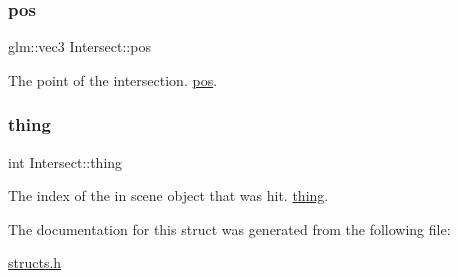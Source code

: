 \subsubsection{\texorpdfstring{pos}{pos}}
{\footnotesize\ttfamily glm\+::vec3 Intersect\+::pos}

The point of the intersection. \mbox{\hyperlink{struct_intersect_acac3d72036e36079b68fdfecf071785c}{pos}}. \mbox{\label{struct_intersect_a0db00f51f704942fd24de64379a74c28}} 
\subsubsection{\texorpdfstring{thing}{thing}}
{\footnotesize\ttfamily int Intersect\+::thing}

The index of the in scene object that was hit. \mbox{\hyperlink{struct_intersect_a0db00f51f704942fd24de64379a74c28}{thing}}. 

The documentation for this struct was generated from the following file\+:\begin{DoxyCompactItemize}
\item 
\mbox{\hyperlink{structs_8h}{structs.\+h}}\end{DoxyCompactItemize}
